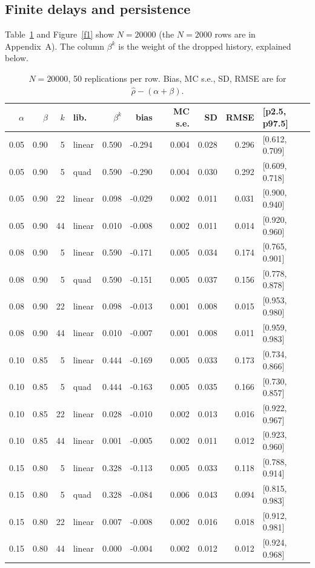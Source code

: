 \documentclass[11pt]{article}
\newcommand{\rhohat}{\hat\rho}
\begin{document}
\subsection{Finite delays and persistence}
Table~\ref{t1} and Figure~\ref{f1} show $N=20000$ (the $N=2000$ rows are in Appendix~A). The column $\beta^k$ is the weight of the dropped history, explained below.
\begin{table}[!htbp]\centering\small\caption{$N=20000$, 50 replications per row. Bias, MC s.e., SD, RMSE are for $\rhohat-(\alpha+\beta)$.}\label{t1}
\begin{tabular}{rrrlrrrrrl}\hline
$\alpha$&$\beta$&$k$&lib.&$\beta^k$&bias&MC s.e.&SD&RMSE&[p2.5, p97.5]\\\hline
0.05 & 0.90 & 5 & linear & 0.590 & -0.294 & 0.004 & 0.028 & 0.296 & [0.612, 0.709] \\
0.05 & 0.90 & 5 & quad & 0.590 & -0.290 & 0.004 & 0.030 & 0.292 & [0.609, 0.718] \\
0.05 & 0.90 & 22 & linear & 0.098 & -0.029 & 0.002 & 0.011 & 0.031 & [0.900, 0.940] \\
0.05 & 0.90 & 44 & linear & 0.010 & -0.008 & 0.002 & 0.011 & 0.014 & [0.920, 0.960] \\
0.08 & 0.90 & 5 & linear & 0.590 & -0.171 & 0.005 & 0.034 & 0.174 & [0.765, 0.901] \\
0.08 & 0.90 & 5 & quad & 0.590 & -0.151 & 0.005 & 0.037 & 0.156 & [0.778, 0.878] \\
0.08 & 0.90 & 22 & linear & 0.098 & -0.013 & 0.001 & 0.008 & 0.015 & [0.953, 0.980] \\
0.08 & 0.90 & 44 & linear & 0.010 & -0.007 & 0.001 & 0.008 & 0.011 & [0.959, 0.983] \\
0.10 & 0.85 & 5 & linear & 0.444 & -0.169 & 0.005 & 0.033 & 0.173 & [0.734, 0.866] \\
0.10 & 0.85 & 5 & quad & 0.444 & -0.163 & 0.005 & 0.035 & 0.166 & [0.730, 0.857] \\
0.10 & 0.85 & 22 & linear & 0.028 & -0.010 & 0.002 & 0.013 & 0.016 & [0.922, 0.967] \\
0.10 & 0.85 & 44 & linear & 0.001 & -0.005 & 0.002 & 0.011 & 0.012 & [0.923, 0.960] \\
0.15 & 0.80 & 5 & linear & 0.328 & -0.113 & 0.005 & 0.033 & 0.118 & [0.788, 0.914] \\
0.15 & 0.80 & 5 & quad & 0.328 & -0.084 & 0.006 & 0.043 & 0.094 & [0.815, 0.983] \\
0.15 & 0.80 & 22 & linear & 0.007 & -0.008 & 0.002 & 0.016 & 0.018 & [0.912, 0.981] \\
0.15 & 0.80 & 44 & linear & 0.000 & -0.004 & 0.002 & 0.012 & 0.012 & [0.924, 0.968] \\
\hline\end{tabular}\end{table}
\end{document}
